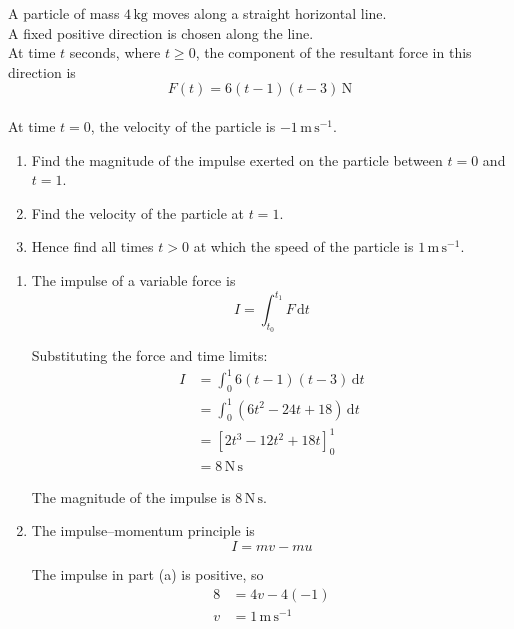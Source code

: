 \documentclass[leqno]{article}
\begin{document}
\begin{enumerate}[
  label=\textbf{\arabic*.},
  leftmargin=*,
  topsep=0pt,
  partopsep=0pt,
  parsep=0pt
]
\newpage

\questionitem

A particle of mass $4\,\mathrm{kg}$ moves along a straight horizontal line. \\
A fixed positive direction is chosen along the line. \\
At time $t$ seconds, where $t\geq 0$, the component of the resultant force in this direction is
\[
F(t)=6(t-1)(t-3)\,\mathrm{N}
\] \\
At time $t=0$, the velocity of the particle is $-1\,\mathrm{m\,s^{-1}}$. \\
\begin{enumerate}[label=\textbf{(\alph*)}]
\item Find the magnitude of the impulse exerted on the particle between $t=0$ and $t=1$.  \\
\item Find the velocity of the particle at $t=1$.  \\
\item Hence find all times $t>0$ at which the speed of the particle is $1\,\mathrm{m\,s^{-1}}$.  \\
\end{enumerate}

\vspace*{10pt}

\begin{djsSolution}
\begin{enumerate}[label=\textbf{(\alph*)}, start=1]
\item The impulse of a variable force is
\[
I=\int_{t_0}^{t_1}F\,\mathrm{d}t
\]

Substituting the force and time limits:
\begin{align*}
I&=\int_0^1 6(t-1)(t-3)\,\mathrm{d}t\\
&=\int_0^1(6t^2-24t+18)\,\mathrm{d}t\\
&=\left[2t^3-12t^2+18t\right]_0^1\\
&=8\,\mathrm{N\,s}
\end{align*}

The magnitude of the impulse is \(8\,\mathrm{N\,s}\).

\item The impulse--momentum principle is
\[
I=mv-mu
\]

The impulse in part (a) is positive, so
\begin{align*}
8&=4v-4(-1)\\
v&=1\,\mathrm{m\,s^{-1}}
\end{align*}


\end{enumerate}
\end{djsSolution}
\end{enumerate}
\end{document}
